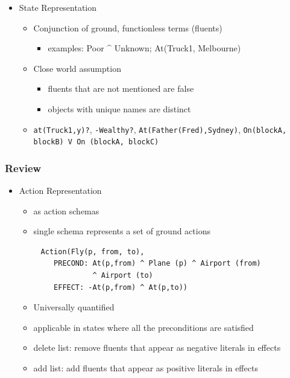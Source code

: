 \documentclass[compress, 9pt]{beamer}
\begin{document}
\begin{frame}
\begin{itemize}
\item <5-> State Representation
\label{sec-1-1-4}%
\begin{itemize}
\item <6-> Conjunction of ground, functionless terms (fluents)
\begin{itemize}
\item examples: Poor \^{} Unknown; At(Truck1, Melbourne)
\end{itemize}
\item <6-> Close world assumption
\begin{itemize}
\item <7-> fluents that are not mentioned are false
\item <7-> objects with unique names are distinct
\end{itemize}
\item <8-> \texttt{at(Truck1,y)?}, \texttt{-Wealthy?}, \texttt{At(Father(Fred),Sydney)},
  \texttt{On(blockA, blockB) V On (blockA, blockC)}
\end{itemize}
\end{itemize} %
\end{frame}
\begin{frame}[fragile]
\frametitle{Review}
\label{sec-1-2}
\begin{itemize}

\item Action Representation
\label{sec-1-2-1}%
\begin{itemize}
\item as action schemas
\item single schema represents a set of ground actions
\end{itemize}
\begin{verbatim}
     Action(Fly(p, from, to),
        PRECOND: At(p,from) ^ Plane (p) ^ Airport (from) 
                 ^ Airport (to)
        EFFECT: -At(p,from) ^ At(p,to))
\end{verbatim}
\begin{itemize}
\item Universally quantified
\item applicable in states where all the preconditions are satisfied
\item delete list: remove fluents that appear as negative literals in effects
\item add list: add fluents that appear as positive literals in effects
\end{itemize}

\end{itemize} %
\end{frame}
\end{document}

